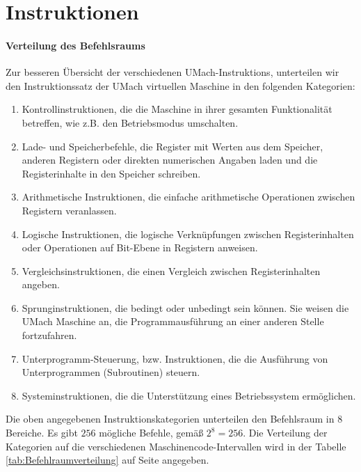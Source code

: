\section{Instruktionen}

\paragraph{Verteilung des Befehlsraums}
Zur besseren Übersicht der verschiedenen UMach-\glspl{Instruktion}, unterteilen
wir den \gls{Instruktionssatz} der UMach virtuellen Maschine in den folgenden
Kategorien:

\begin{enumerate}
  \item Kontrollinstruktionen,  die die Maschine in ihrer gesamten
    Funktionalität betreffen, wie z.B. den Betriebsmodus umschalten.
  \item Lade- und Speicherbefehle, die Register mit Werten aus dem Speicher, 
    anderen Registern oder direkten numerischen Angaben laden und die
    Registerinhalte in den Speicher schreiben.
  \item Arithmetische Instruktionen, die einfache arithmetische Operationen
    zwischen Registern veranlassen.
  \item Logische Instruktionen, die logische Verknüpfungen zwischen
    Registerinhalten oder Operationen auf Bit-Ebene in Registern anweisen.
  \item Vergleichsinstruktionen, die einen Vergleich zwischen
    Registerinhalten angeben.
  \item Sprunginstruktionen, die bedingt oder unbedingt sein können.
    Sie weisen die UMach Maschine an, die Programmausführung an einer anderen
    Stelle fortzufahren.
  \item Unterprogramm-Steuerung, bzw. Instruktionen, die die Ausführung von
    Unterprogrammen (Subroutinen) steuern.
  \item Systeminstruktionen, die die Unterstützung eines
    Betriebssystem ermöglichen.
\end{enumerate}

Die oben angegebenen Instruktionskategorien unterteilen den \gls{Befehlsraum} in
8 Bereiche. Es gibt $256$ mögliche Befehle, gemäß $2^{8} = 256$.
Die Verteilung der Kategorien auf die verschiedenen Maschinencode-Intervallen
wird in der Tabelle \ref{tab:Befehlraumverteilung} auf Seite
\pageref{tab:Befehlraumverteilung} angegeben.

